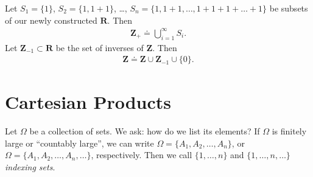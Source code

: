 \begin{definition}
Let $S_{1} = \{1\}$,
$S_{2} = \{1, 1+1\}$, \dots, $S_{n} = \{1, 1+1, \dots, 1+1+1+\dots+1\}$
be subsets of our newly constructed $\mathbf{R}$. Then
\begin{equation*}
\begin{split}
\mathbf{Z}_{+} \doteq \bigcup_{i=1}^{\infty} S_{i}.
\end{split}
\end{equation*}
Let $\mathbf{Z}_{-1} \subset \mathbf{R}$ be the set of inverses of $\mathbf{Z}$. Then
\begin{equation*}
\begin{split}
\mathbf{Z} \doteq \mathbf{Z} \cup \mathbf{Z}_{-1} \cup \{0\}.
\end{split}
\end{equation*}
\end{definition}
\begin{definition}[Induction]
\end{definition}
\section{Cartesian Products}
Let $\Omega$ be a collection of sets. We ask: how do we list its elements?
If $\Omega$ is finitely large or ``countably large'', we can write
$\Omega = \{ A_{1}, A_{2}, \dots, A_{n}\}$, or
$\Omega = \{ A_{1}, A_{2}, \dots, A_{n}, \dots\}$, respectively.
Then we call $\{ 1,\dots, n\}$ and $\{1, \dots, n, \dots\}$ \emph{indexing
sets}.

